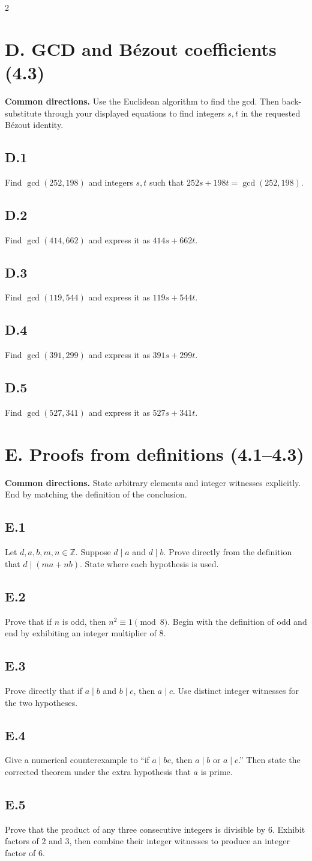 \documentclass{article}
\newcommand{\problem}[1]{\par\subsection*{#1}}
\begin{document}
\begin{multicols*}{2}

\section*{D. GCD and B\'ezout coefficients (4.3)}

\textbf{Common directions.} Use the Euclidean algorithm to find the gcd.
Then back-substitute through your displayed equations to find integers $s,t$
in the requested B\'ezout identity.

\problem{D.1}
Find $\gcd(252,198)$ and integers $s,t$ such that
$252s+198t=\gcd(252,198)$.

\vfill
\problem{D.2}
Find $\gcd(414,662)$ and express it as $414s+662t$.

\vfill
\problem{D.3}
Find $\gcd(119,544)$ and express it as $119s+544t$.

\vfill
\problem{D.4}
Find $\gcd(391,299)$ and express it as $391s+299t$.

\vfill
\problem{D.5}
Find $\gcd(527,341)$ and express it as $527s+341t$.

\columnbreak

\section*{E. Proofs from definitions (4.1--4.3)}

\textbf{Common directions.} State arbitrary elements and integer witnesses
explicitly. End by matching the definition of the conclusion.

\problem{E.1}
Let $d,a,b,m,n\in\mathbb Z$. Suppose $d\mid a$ and $d\mid b$. Prove directly
from the definition that $d\mid(ma+nb)$. State where each hypothesis is used.

\vfill
\problem{E.2}
Prove that if $n$ is odd, then $n^2\equiv1\pmod{8}$. Begin with the definition
of odd and end by exhibiting an integer multiplier of $8$.

\vfill
\problem{E.3}
Prove directly that if $a\mid b$ and $b\mid c$, then $a\mid c$. Use distinct
integer witnesses for the two hypotheses.

\vfill
\problem{E.4}
Give a numerical counterexample to ``if $a\mid bc$, then $a\mid b$ or
$a\mid c$.'' Then state the corrected theorem under the extra hypothesis that
$a$ is prime.

\vfill
\problem{E.5}
Prove that the product of any three consecutive integers is divisible by $6$.
Exhibit factors of $2$ and $3$, then combine their integer witnesses to
produce an integer factor of $6$.

\end{multicols*}
\end{document}
